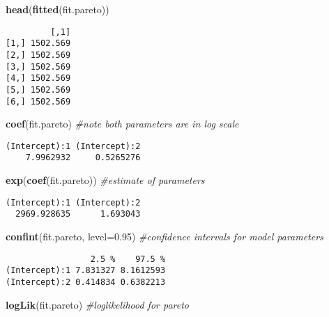 \documentclass[]{book}
\newenvironment{Shaded}{\begin{snugshade}}{\end{snugshade}}
\newcommand{\KeywordTok}[1]{\textcolor[rgb]{0.13,0.29,0.53}{\textbf{#1}}}
\newcommand{\DataTypeTok}[1]{\textcolor[rgb]{0.13,0.29,0.53}{#1}}
\newcommand{\FloatTok}[1]{\textcolor[rgb]{0.00,0.00,0.81}{#1}}
\newcommand{\CommentTok}[1]{\textcolor[rgb]{0.56,0.35,0.01}{\textit{#1}}}
\newcommand{\NormalTok}[1]{#1}
\theoremstyle{definition}
\theoremstyle{definition}
\theoremstyle{definition}
\theoremstyle{remark}
\begin{document}
\begin{Shaded}
\begin{Highlighting}[]
\KeywordTok{head}\NormalTok{(}\KeywordTok{fitted}\NormalTok{(fit.pareto))}
\end{Highlighting}
\end{Shaded}

\begin{verbatim}
         [,1]
[1,] 1502.569
[2,] 1502.569
[3,] 1502.569
[4,] 1502.569
[5,] 1502.569
[6,] 1502.569
\end{verbatim}

\begin{Shaded}
\begin{Highlighting}[]
\KeywordTok{coef}\NormalTok{(fit.pareto)                 }\CommentTok{#note both parameters are in log scale}
\end{Highlighting}
\end{Shaded}

\begin{verbatim}
(Intercept):1 (Intercept):2 
    7.9962932     0.5265276 
\end{verbatim}

\begin{Shaded}
\begin{Highlighting}[]
\KeywordTok{exp}\NormalTok{(}\KeywordTok{coef}\NormalTok{(fit.pareto))            }\CommentTok{#estimate of parameters}
\end{Highlighting}
\end{Shaded}

\begin{verbatim}
(Intercept):1 (Intercept):2 
  2969.928635      1.693043 
\end{verbatim}

\begin{Shaded}
\begin{Highlighting}[]
\KeywordTok{confint}\NormalTok{(fit.pareto, }\DataTypeTok{level=}\FloatTok{0.95}\NormalTok{)  }\CommentTok{#confidence intervals for model parameters }
\end{Highlighting}
\end{Shaded}

\begin{verbatim}
                 2.5 %    97.5 %
(Intercept):1 7.831327 8.1612593
(Intercept):2 0.414834 0.6382213
\end{verbatim}

\begin{Shaded}
\begin{Highlighting}[]
\KeywordTok{logLik}\NormalTok{(fit.pareto)               }\CommentTok{#loglikelihood for pareto}
\end{Highlighting}
\end{Shaded}
\end{document}
